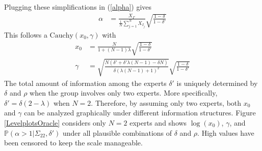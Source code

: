 \documentclass[11pt]{article}
\renewcommand{\P}{\mathbb{P}}
\theoremstyle{definition}
\theoremstyle{definition}
\begin{document}
Plugging these simplifications in (\ref{alpha}) gives 
\begin{align*}
\alpha &= \frac{X_{I'}}{\frac{1}{N}\sum_{j=1}^N X_{I_j}} \sqrt{\frac{1-\delta}{1-\delta'}} 
\end{align*}
This follows a $\text{Cauchy}(x_0, \gamma)$ with
\begin{align*}
x_0 &= \frac{N}{1+(N-1)\lambda}  \sqrt{\frac{1-\delta}{1-\delta'}}\\
 \gamma &=  \sqrt{\frac{N(\delta' + \delta' \lambda (N-1) - \delta N)}{\delta (\lambda (N-1) + 1)^2}}\sqrt{\frac{1-\delta}{1-\delta'}}
\end{align*}
The total amount of information among the experts $\delta'$ is uniquely determined by $\delta$ and $\rho$ when the group involves only two experts. More specifically, $\delta' = \delta(2 - \lambda)$ when $N=2$. Therefore, by assuming only two experts, both $x_0$ and $\gamma$ can be analyzed graphically under different information structures. Figure \ref{LevelplotsOracle} considers only $N=2$ experts and shows $\log(x_0)$, $\gamma$, and $\P(\alpha > 1 | \Sigma_{22}, \delta')$ under all plausible combinations of $\delta$ and $\rho$. High values have been censored to keep the scale manageable. 
\end{document}
